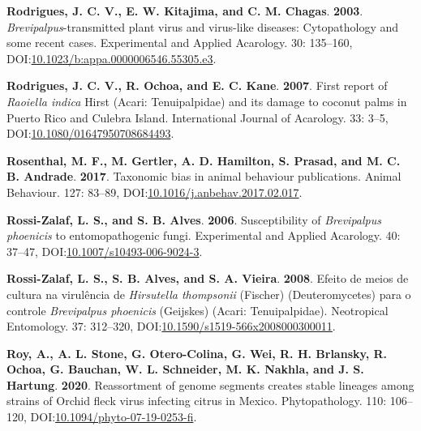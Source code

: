 \documentclass[12pt,final,CPage]{ufthesis}
\newlength{\cslhangindent}
\newenvironment{CSLReferences}[2] %
{%
	\setlength{\parindent}{0pt}
	\ifodd #1 \everypar{\setlength{\hangindent}{\cslhangindent}}\ignorespaces\fi
	\ifnum #2 > 0
	\setlength{\parskip}{#2\baselineskip}
	\fi
}%
{}
\begin{document}
{\begin{CSLReferences}{1}{0}
  \leavevmode{}%
  \textbf{Rodrigues, J. C. V., E. W. Kitajima, and C. M. Chagas}. \textbf{2003}. {\emph{Brevipalpus}}-transmitted plant virus and virus-like diseases: Cytopathology and some recent cases. Experimental and Applied Acarology. 30: 135--160, DOI:\href{https://doi.org/10.1023/b:appa.0000006546.55305.e3}{10.1023/b:appa.0000006546.55305.e3}.

  \leavevmode{}%
  \textbf{Rodrigues, J. C. V., R. Ochoa, and E. C. Kane}. \textbf{2007}. First report of {\emph{Raoiella indica}} {Hirst} ({Acari}: {Tenuipalpidae}) and its damage to coconut palms in {Puerto Rico} and {Culebra Island}. International Journal of Acarology. 33: 3--5, DOI:\href{https://doi.org/10.1080/01647950708684493}{10.1080/01647950708684493}.

  \leavevmode{}%
  \textbf{Rosenthal, M. F., M. Gertler, A. D. Hamilton, S. Prasad, and M. C. B. Andrade}. \textbf{2017}. Taxonomic bias in animal behaviour publications. Animal Behaviour. 127: 83--89, DOI:\href{https://doi.org/10.1016/j.anbehav.2017.02.017}{10.1016/j.anbehav.2017.02.017}.

  \leavevmode{}%
  \textbf{Rossi-Zalaf, L. S., and S. B. Alves}. \textbf{2006}. Susceptibility of {\emph{Brevipalpus phoenicis}} to entomopathogenic fungi. Experimental and Applied Acarology. 40: 37--47, DOI:\href{https://doi.org/10.1007/s10493-006-9024-3}{10.1007/s10493-006-9024-3}.

  \leavevmode{}%
  \textbf{Rossi-Zalaf, L. S., S. B. Alves, and S. A. Vieira}. \textbf{2008}. Efeito de meios de cultura na virul{ê}ncia de {\emph{Hirsutella thompsonii}} ({Fischer}) ({Deuteromycetes}) para o controle {\emph{Brevipalpus phoenicis}} ({Geijskes}) ({Acari}: {Tenuipalpidae}). Neotropical Entomology. 37: 312--320, DOI:\href{https://doi.org/10.1590/s1519-566x2008000300011}{10.1590/s1519-566x2008000300011}.

  \leavevmode{}%
  \textbf{Roy, A., A. L. Stone, G. Otero-Colina, G. Wei, R. H. Brlansky, R. Ochoa, G. Bauchan, W. L. Schneider, M. K. Nakhla, and J. S. Hartung}. \textbf{2020}. Reassortment of genome segments creates stable lineages among strains of {Orchid fleck virus} infecting citrus in {Mexico}. Phytopathology{\textregistered}. 110: 106--120, DOI:\href{https://doi.org/10.1094/phyto-07-19-0253-fi}{10.1094/phyto-07-19-0253-fi}.


\end{CSLReferences}}
\end{document}
